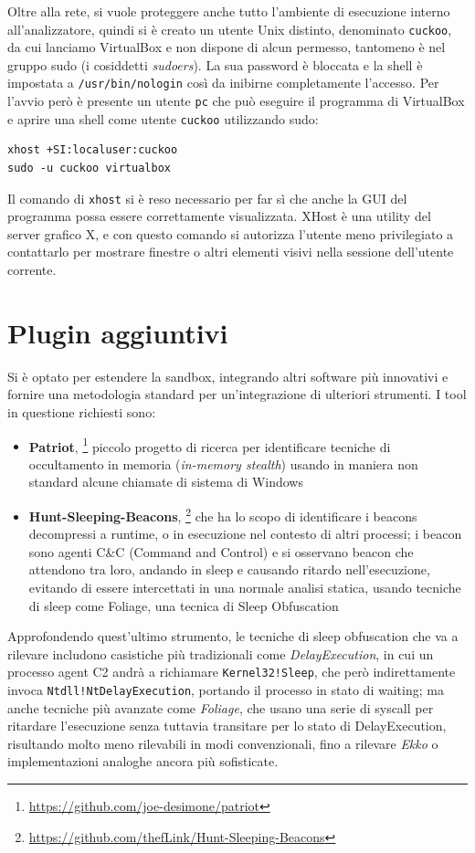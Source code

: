 Oltre alla rete, si vuole proteggere anche tutto l'ambiente di esecuzione interno all'analizzatore, quindi si è creato un utente Unix distinto, denominato \texttt{cuckoo}, da cui lanciamo VirtualBox e non dispone di alcun permesso, tantomeno è nel gruppo sudo (i cosiddetti \emph{sudoers}). La sua password è bloccata e la shell è impostata a \texttt{/usr/bin/nologin} così da inibirne completamente l'accesso.
Per l'avvio però è presente un utente \texttt{pc} che può eseguire il programma di VirtualBox e aprire una shell come utente \texttt{cuckoo} utilizzando sudo:
\begin{verbatim}
xhost +SI:localuser:cuckoo
sudo -u cuckoo virtualbox
\end{verbatim}
Il comando di \texttt{xhost} si è reso necessario per far sì che anche la GUI del programma possa essere correttamente visualizzata. XHost è una utility del server grafico X, e con questo comando si autorizza l'utente meno privilegiato a contattarlo per mostrare finestre o altri elementi visivi nella sessione dell'utente corrente.

\section{Plugin aggiuntivi}
Si è optato per estendere la sandbox, integrando altri software più innovativi e fornire una metodologia standard per un'integrazione di ulteriori strumenti.
I tool in questione richiesti sono:
\begin{itemize}
    \item \textbf{Patriot},
    \footnote{\url{https://github.com/joe-desimone/patriot}}
    piccolo progetto di ricerca per identificare tecniche di occultamento in memoria (\emph{in-memory stealth}) usando in maniera non standard alcune chiamate di sistema di Windows
    \item \textbf{Hunt-Sleeping-Beacons},
    \footnote{\url{https://github.com/thefLink/Hunt-Sleeping-Beacons}}
    che ha lo scopo di identificare i beacons decompressi a runtime, o in esecuzione nel contesto di altri processi; i beacon sono agenti C\&C (Command and Control) e si osservano beacon che attendono tra loro, andando in sleep e causando ritardo nell'esecuzione, evitando di essere intercettati in una normale analisi statica, usando tecniche di sleep come Foliage, una tecnica di Sleep Obfuscation
\end{itemize}

Approfondendo quest'ultimo strumento, le tecniche di sleep obfuscation che va a rilevare includono casistiche più tradizionali come \emph{DelayExecution}, in cui un processo agent C2 andrà a richiamare \texttt{Kernel32!Sleep}, che però indirettamente invoca \texttt{Ntdll!NtDelayExecution}, portando il processo in stato di waiting;
ma anche tecniche più avanzate come \emph{Foliage}, che usano una serie di syscall per ritardare l'esecuzione senza tuttavia transitare per lo stato di DelayExecution, risultando molto meno rilevabili in modi convenzionali, fino a rilevare \emph{Ekko} o implementazioni analoghe ancora più sofisticate.

